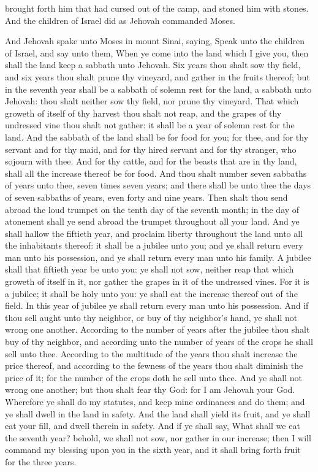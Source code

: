 brought forth him that had cursed out of the camp, and stoned him with stones. And the children of Israel did as Jehovah commanded Moses. 

And Jehovah spake unto Moses in mount Sinai, saying, Speak unto the children of Israel, and say unto them, When ye come into the land which I give you, then shall the land keep a sabbath unto Jehovah. Six years thou shalt sow thy field, and six years thou shalt prune thy vineyard, and gather in the fruits thereof; but in the seventh year shall be a sabbath of solemn rest for the land, a sabbath unto Jehovah: thou shalt neither sow thy field, nor prune thy vineyard. That which groweth of itself of thy harvest thou shalt not reap, and the grapes of thy undressed vine thou shalt not gather: it shall be a year of solemn rest for the land. And the sabbath of the land shall be for food for you; for thee, and for thy servant and for thy maid, and for thy hired servant and for thy stranger, who sojourn with thee. And for thy cattle, and for the beasts that are in thy land, shall all the increase thereof be for food.  And thou shalt number seven sabbaths of years unto thee, seven times seven years; and there shall be unto thee the days of seven sabbaths of years, even forty and nine years. Then shalt thou send abroad the loud trumpet on the tenth day of the seventh month; in the day of atonement shall ye send abroad the trumpet throughout all your land. And ye shall hallow the fiftieth year, and proclaim liberty throughout the land unto all the inhabitants thereof: it shall be a jubilee unto you; and ye shall return every man unto his possession, and ye shall return every man unto his family. A jubilee shall that fiftieth year be unto you: ye shall not sow, neither reap that which groweth of itself in it, nor gather the grapes in it of the undressed vines. For it is a jubilee; it shall be holy unto you: ye shall eat the increase thereof out of the field.  In this year of jubilee ye shall return every man unto his possession. And if thou sell aught unto thy neighbor, or buy of thy neighbor’s hand, ye shall not wrong one another. According to the number of years after the jubilee thou shalt buy of thy neighbor, and according unto the number of years of the crops he shall sell unto thee. According to the multitude of the years thou shalt increase the price thereof, and according to the fewness of the years thou shalt diminish the price of it; for the number of the crops doth he sell unto thee. And ye shall not wrong one another; but thou shalt fear thy God: for I am Jehovah your God.  Wherefore ye shall do my statutes, and keep mine ordinances and do them; and ye shall dwell in the land in safety. And the land shall yield its fruit, and ye shall eat your fill, and dwell therein in safety. And if ye shall say, What shall we eat the seventh year? behold, we shall not sow, nor gather in our increase; then I will command my blessing upon you in the sixth year, and it shall bring forth fruit for the three years. 